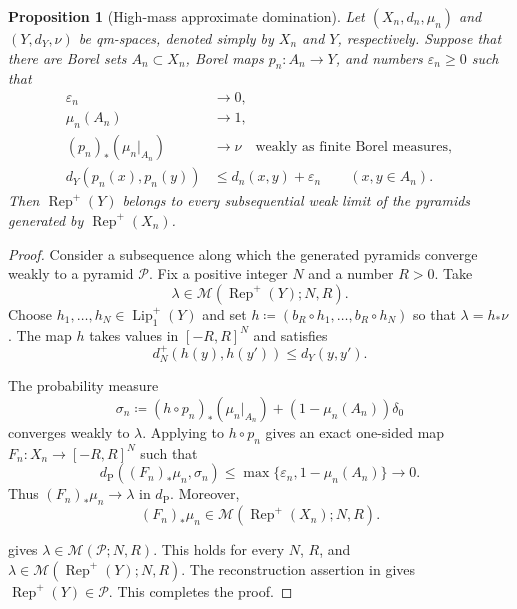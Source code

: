\documentclass{amsart}
\theoremstyle{plain}
\newtheorem{proposition}[theorem]{Proposition}
\theoremstyle{definition}
\theoremstyle{remark}
\newcommand{\M}{\mathcal{M}}
\newcommand{\lipplus}{\operatorname{Lip}^{+}_{1}}
\newcommand{\dpr}{d_{\operatorname{P}}}
\begin{document}
\begin{proposition}[High-mass approximate domination]
\label{prop:high-mass-approximate-domination}
Let $(X_n,d_n,\mu_n)$ and $(Y,d_Y,\nu)$ be qm-spaces, denoted simply by $X_n$ and $Y$, respectively.  Suppose that
there are Borel sets $A_n\subset X_n$, Borel maps $p_n\colon A_n\to Y$, and
numbers $\varepsilon_n\geq0$ such that
\begin{align}
\varepsilon_n&\longrightarrow0, \label{eq:high-mass-domination-error}\\
\mu_n(A_n)&\longrightarrow1, \label{eq:high-mass-domination-mass}\\
(p_n)_*(\mu_n|_{A_n})&\longrightarrow\nu
\quad\text{weakly as finite Borel measures},
\label{eq:high-mass-domination-measure}\\
d_Y(p_n(x),p_n(y))&\leq d_n(x,y)+\varepsilon_n
\qquad(x,y\in A_n).
\label{eq:high-mass-domination-distance}
\end{align}
Then $\operatorname{Rep}^{+}(Y)$ belongs to every subsequential weak limit of the
pyramids generated by $\operatorname{Rep}^{+}(X_n)$.
\end{proposition}

\begin{proof}
Consider a subsequence along which the generated pyramids converge weakly to
a pyramid $\mathcal P$.  Fix a positive integer $N$ and a number $R>0$.  Take
\[
\lambda\in\M(\operatorname{Rep}^{+}(Y);N,R).
\]
Choose $h_1,\ldots,h_N\in\lipplus(Y)$ and set
$h\coloneqq(b_R\circ h_1,\ldots,b_R\circ h_N)$ so that
$\lambda=h_*\nu$.  The map $h$ takes values in $[-R,R]^N$ and satisfies
\[
d_N^+(h(y),h(y'))\leq d_Y(y,y').
\]

The probability measure
\[ \sigma_n\coloneqq (h\circ p_n)_*(\mu_n|_{A_n})+ (1-\mu_n(A_n))\delta_0 \]
converges weakly to $\lambda$.  Applying
 to $h\circ p_n$ gives an
exact one-sided map $F_n\colon X_n\to[-R,R]^N$ such that
\[ \dpr((F_n)_*\mu_n,\sigma_n)\leq \max\{\varepsilon_n,1-\mu_n(A_n)\}\longrightarrow0. \]
Thus $(F_n)_*\mu_n\to\lambda$ in $\dpr$.  Moreover,
\[
(F_n)_*\mu_n\in\M(\operatorname{Rep}^{+}(X_n);N,R).
\]

gives $\lambda\in\M(\mathcal P;N,R)$.  This holds for every $N$, $R$, and
$\lambda\in\M(\operatorname{Rep}^{+}(Y);N,R)$.  The reconstruction assertion
in  gives
$\operatorname{Rep}^{+}(Y)\in\mathcal P$.  This completes the proof.
\end{proof}
\end{document}
